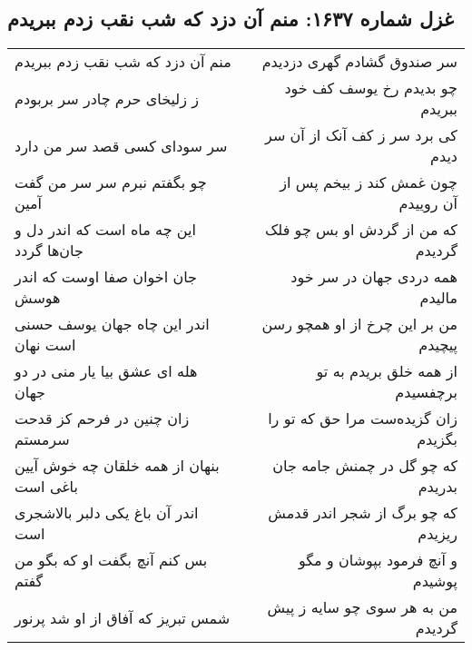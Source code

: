 \begin{center}
\section*{غزل شماره ۱۶۳۷: منم آن دزد که شب نقب زدم ببریدم}
\label{sec:1637}
\begin{longtable}{l p{0.5cm} r}
منم آن دزد که شب نقب زدم ببریدم
&&
سر صندوق گشادم گهری دزدیدم
\\
ز زلیخای حرم چادر سر بربودم
&&
چو بدیدم رخ یوسف کف خود ببریدم
\\
سر سودای کسی قصد سر من دارد
&&
کی برد سر ز کف آنک از آن سر دیدم
\\
چو بگفتم نبرم سر سر من گفت آمین
&&
چون غمش کند ز بیخم پس از آن روییدم
\\
این چه ماه است که اندر دل و جان‌ها گردد
&&
که من از گردش او بس چو فلک گردیدم
\\
جان اخوان صفا اوست که اندر هوسش
&&
همه دردی جهان در سر خود مالیدم
\\
اندر این چاه جهان یوسف حسنی است نهان
&&
من بر این چرخ از او همچو رسن پیچیدم
\\
هله ای عشق بیا یار منی در دو جهان
&&
از همه خلق بریدم به تو برچفسیدم
\\
زان چنین در فرحم کز قدحت سرمستم
&&
زان گزیده‌ست مرا حق که تو را بگزیدم
\\
بنهان از همه خلقان چه خوش آیین باغی است
&&
که چو گل در چمنش جامه جان بدریدم
\\
اندر آن باغ یکی دلبر بالاشجری است
&&
که چو برگ از شجر اندر قدمش ریزیدم
\\
بس کنم آنچ بگفت او که بگو من گفتم
&&
و آنچ فرمود بپوشان و مگو پوشیدم
\\
شمس تبریز که آفاق از او شد پرنور
&&
من به هر سوی چو سایه ز پیش گردیدم
\\
\end{longtable}
\end{center}
